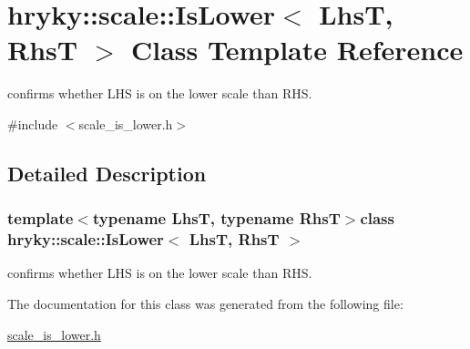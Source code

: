 \hypertarget{classhryky_1_1scale_1_1_is_lower}{\section{hryky\-:\-:scale\-:\-:Is\-Lower$<$ Lhs\-T, Rhs\-T $>$ Class Template Reference}
\label{classhryky_1_1scale_1_1_is_lower}
}


confirms whether L\-H\-S is on the lower scale than R\-H\-S.  




{\ttfamily \#include $<$scale\-\_\-is\-\_\-lower.\-h$>$}



\subsection{Detailed Description}
\subsubsection*{template$<$typename Lhs\-T, typename Rhs\-T$>$class hryky\-::scale\-::\-Is\-Lower$<$ Lhs\-T, Rhs\-T $>$}

confirms whether L\-H\-S is on the lower scale than R\-H\-S. 

The documentation for this class was generated from the following file\-:\begin{DoxyCompactItemize}
\item 
\hyperlink{scale__is__lower_8h}{scale\-\_\-is\-\_\-lower.\-h}\end{DoxyCompactItemize}
